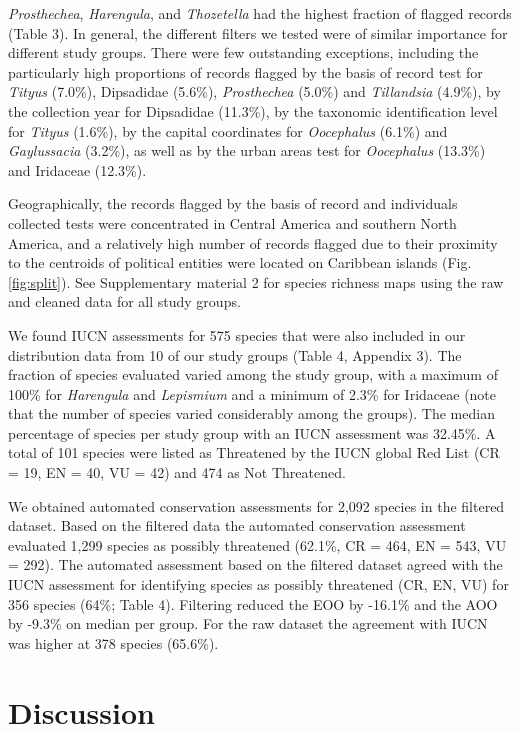 \documentclass[
  12pt,
]{article}
\begin{document}
\emph{Prosthechea}, \emph{Harengula}, and \emph{Thozetella} had the highest fraction of flagged records (Table 3). In general, the different filters we tested were of similar importance for different study groups. There were few outstanding exceptions, including the particularly high proportions of records flagged by the basis of record test for \emph{Tityus} (7.0\%), Dipsadidae (5.6\%), \emph{Prosthechea} (5.0\%) and \emph{Tillandsia} (4.9\%), by the collection year for Dipsadidae (11.3\%), by the taxonomic identification level for \emph{Tityus} (1.6\%), by the capital coordinates for \emph{Oocephalus} (6.1\%) and \emph{Gaylussacia} (3.2\%), as well as by the urban areas test for \emph{Oocephalus} (13.3\%) and Iridaceae (12.3\%).

Geographically, the records flagged by the basis of record and individuals collected tests were concentrated in Central America and southern North America, and a relatively high number of records flagged due to their proximity to the centroids of political entities were located on Caribbean islands (Fig. \ref{fig:split}). See Supplementary material 2 for species richness maps using the raw and cleaned data for all study groups.

We found IUCN assessments for 575 species that were also included in our distribution data from 10 of our study groups (Table 4, Appendix 3). The fraction of species evaluated varied among the study group, with a maximum of 100\% for \emph{Harengula} and \emph{Lepismium} and a minimum of 2.3\% for Iridaceae (note that the number of species varied considerably among the groups). The median percentage of species per study group with an IUCN assessment was 32.45\%. A total of 101 species were listed as Threatened by the IUCN global Red List (CR = 19, EN = 40, VU = 42) and 474 as Not Threatened.

We obtained automated conservation assessments for 2,092 species in the filtered dataset. Based on the filtered data the automated conservation assessment evaluated 1,299 species as possibly threatened (62.1\%, CR = 464, EN = 543, VU = 292). The automated assessment based on the filtered dataset agreed with the IUCN assessment for identifying species as possibly threatened (CR, EN, VU) for 356 species (64\%; Table 4). Filtering reduced the EOO by -16.1\% and the AOO by -9.3\% on median per group. For the raw dataset the agreement with IUCN was higher at 378 species (65.6\%).

\hypertarget{discussion}{%
\section{Discussion}\label{discussion}}
\end{document}
